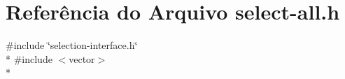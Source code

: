 \section{Referência do Arquivo select-\/all.h}
\label{select-all_8h}
{\ttfamily \#include \char`\"{}selection-\/interface.\+h\char`\"{}}\\*
{\ttfamily \#include $<$vector$>$}\\*
